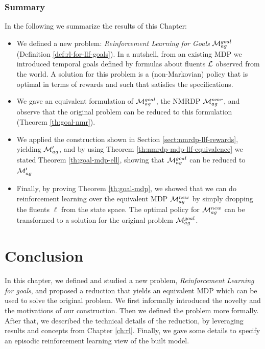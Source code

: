 \subsubsection{Summary}
In the following we summarize the results of this Chapter:
\begin{itemize}
	\item We defined a new problem: \emph{Reinforcement Learning for \LLf Goals} $\mathcal{M}_{ag}^{goal}$ (Definition \ref{def:rl-for-llf-goals}). In a nutshell, from an existing MDP we introduced temporal goals defined by \LLf formulas about fluents $\mathcal{L}$ observed from the world. A solution for this problem is a (non-Markovian) policy that is optimal in terms of rewards and such that satisfies the \LLf specifications.
	\item We gave an equivalent formulation of $\mathcal{M}_{ag}^{goal}$, the NMRDP $\mathcal{M}_{ag}^{nmr}$, and observe that the original problem can be reduced to this formulation (Theorem \ref{th:goal-nmr}).
	\item We applied the construction shown in Section \ref{sect:nmrdp-llf-rewards}, yielding $\mathcal{M}'_{ag}$, and by using Theorem \ref{th:nmrdp-mdp-llf-equivalence} we stated Theorem \ref{th:goal-mdp-ell}, showing that $\mathcal{M}_{ag}^{goal}$ can be reduced to $\mathcal{M}'_{ag}$
	\item Finally, by proving Theorem \ref{th:goal-mdp}, we showed that we can do reinforcement learning over the equivalent MDP $\mathcal{M}_{ag}^{new}$ by simply dropping the fluents $\ell$ from the state space. The optimal policy for $\mathcal{M}_{ag}^{new}$ can be transformed to a solution for the original problem $\mathcal{M}_{ag}^{goal}$.
\end{itemize}

\section{Conclusion}
In this chapter, we defined and studied a new problem, \emph{Reinforcement Learning for \LLf goals}, and proposed a reduction that yields an equivalent MDP which can be used to solve the original problem. We first informally introduced the novelty and the motivations of our construction. Then we defined the problem more formally. After that, we described the technical details of the reduction, by leveraging results and concepts from Chapter \ref{ch:rl}. Finally, we gave some details to specify an episodic reinforcement learning view of the built model. 
